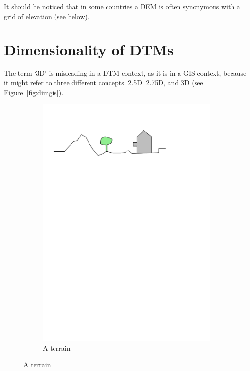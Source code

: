 It should be noticed that in some countries a DEM is often synonymous with a grid of elevation (see below).


%
\section{Dimensionality of DTMs}

The term `3D' is misleading in a DTM context, as it is in a GIS context, because it might refer to three different concepts: 2.5D, 2.75D, and 3D (see Figure~\ref{fig:dimgis}).
\begin{figure}[b]
  \centering
  \begin{subfigure}[b]{0.45\linewidth}
    \centering
    \includegraphics[page=1,width=\linewidth]{figs/dimgis}
    \caption{A terrain}\label{fig:dimgis:1}
  \end{subfigure}%
  \qquad %

\end{figure}
